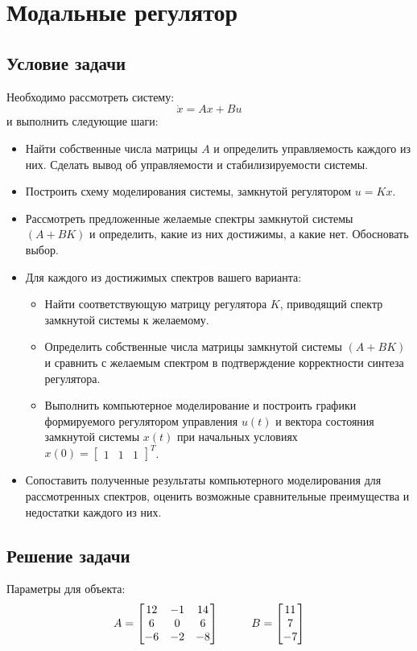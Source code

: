 \chapter{Модальные регулятор}
\label{ch:chap1}
\section{Условие задачи}

Необходимо рассмотреть систему:
$$
  \dot{x} = Ax + Bu
$$ и выполнить следующие шаги:

\begin{itemize}
\item   Найти собственные числа матрицы $A$ и определить управляемость каждого из них. 
Сделать вывод об управляемости и стабилизируемости системы.
\item Построить схему моделирования системы, замкнутой регулятором $u = Kx$.
\item Рассмотреть предложенные желаемые спектры замкнутой системы $(A+BK)$ и определить, 
какие из них достижимы, а какие нет. Обосновать выбор.
\item Для каждого из достижимых спектров вашего варианта:
  \begin{itemize}
    \item Найти соответствующую матрицу регулятора $K$, приводящий спектр 
    замкнутой системы к желаемому.
    \item Определить собственные числа матрицы замкнутой системы $(A+BK)$ и 
    сравнить с желаемым спектром в подтверждение корректности синтеза регулятора.
    \item  Выполнить компьютерное моделирование и построить графики формируемого 
    регулятором управления $u(t)$ и вектора состояния замкнутой системы $x(t)$
     при начальных условиях $x(0) = \begin{bmatrix} 1 & 1 & 1 \end{bmatrix}^T$.
  \end{itemize}
\item Сопоставить полученные результаты компьютерного моделирования для рассмотренных спектров, 
оценить возможные сравнительные преимущества и недостатки  каждого из них.
\end{itemize}

\section{Решение задачи}

Параметры для объекта:
$$
  A = \begin{bmatrix}
  12 & -1 & 14 \\
  6 & 0 & 6 \\
  -6 & -2 & -8 
  \end{bmatrix} \hspace*{1cm}
  B = \begin{bmatrix}
    11 \\ 7 \\ -7 
  \end{bmatrix}
$$

